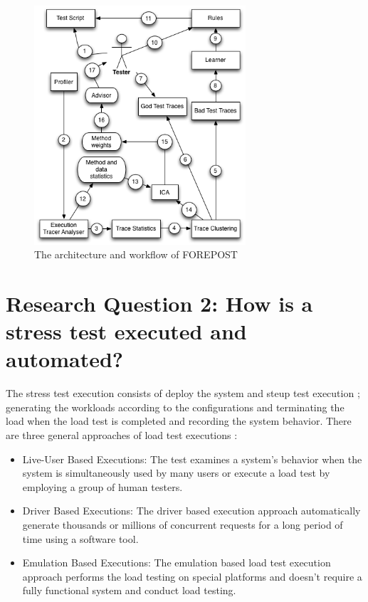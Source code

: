\begin{figure}[!ht]
\centering
\includegraphics[width=0.7\textwidth]{./images/FOREPOST.png}
\caption{The architecture and workflow of FOREPOST}
\label{fig:forepost}
\end{figure}


\section{Research Question 2: How is a stress test executed and automated?}


The stress test execution  consists of deploy the system  and steup test execution ; generating the workloads according to the configurations and terminating the load when the load test is completed and recording the system behavior. There are three general approaches of load test executions \cite{Molyneaux2009}\cite{Jiang2010}:

\begin{itemize}
\item Live-User Based Executions: The test examines a system’s behavior when the system is simultaneously used by many users or execute a load test by employing a group of human testers. 
\item Driver Based Executions: The driver based execution approach automatically generate thousands or millions of concurrent requests for a long period of time using a software tool.
\item Emulation Based Executions: The emulation based load test execution approach performs the load testing on special platforms and doesn't require a fully functional system and conduct load testing.
\end{itemize}

